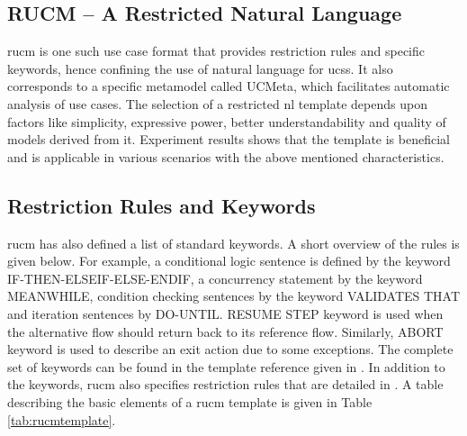 \subsection{RUCM – A Restricted Natural Language}
\gls{rucm} \cite{yue2013facilitating} is one such use case format that provides restriction rules and specific keywords, hence confining the use of natural language for \glspl{ucs}. It also corresponds to a specific metamodel called UCMeta, which facilitates automatic analysis of use cases. The selection of a restricted \gls{nl} template depends upon factors like simplicity, expressive power, better understandability and quality of models derived from it. Experiment results \cite{yue2013facilitating} shows that the template is beneficial and is applicable in various scenarios with the above mentioned characteristics.

\subsection{Restriction Rules and Keywords}
\gls{rucm} has also defined a list of standard keywords. A short overview of the rules is given below. For example, a conditional logic sentence is defined by the keyword IF-THEN-ELSEIF-ELSE-ENDIF, a concurrency statement by the keyword MEANWHILE, condition checking sentences by the keyword VALIDATES THAT and iteration sentences by DO-UNTIL. RESUME STEP keyword is used when the alternative flow should return back to its reference flow. Similarly, ABORT keyword is used to describe an exit action due to some exceptions.  The complete set of keywords can be found in the template reference given in \cite{yue2013facilitating}. In addition to the keywords, \gls{rucm} also specifies restriction rules that are detailed in \cite{yue2013facilitating}. A table describing the basic elements of a \gls{rucm} template is given in Table \ref{tab:rucmtemplate}.

